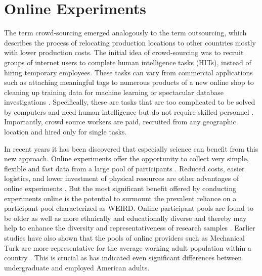 \section{Online Experiments}

The term crowd-sourcing emerged analogously to the term outsourcing, which describes the process of relocating production locations to other countries mostly with lower production costs. The initial idea of crowd-sourcing was to recruit groups of internet users to complete human intelligence tasks (HITs), instead of hiring temporary employees. These tasks can vary from commercial applications such as attaching meaningful tags to numerous products of a new online shop to cleaning up training data for machine learning or spectacular database investigations \parencite{CrowdsourceML,TurkRescue}. Specifically, these are tasks that are too complicated to be solved by computers and need human intelligence but do not require skilled personnel \parencite{BerendViabCrowd2011}. 
Importantly, crowd source workers are paid, recruited from any geographic location and hired only for single tasks. 

In recent years it has been discovered that especially science can benefit from this new approach. Online experiments offer the opportunity to collect very simple, flexible and fast data from a large pool of participants \parencite{BerendViabCrowd2011, truellResponse2002}. Reduced costs, easier logistics, and lower investment of physical resources are other advantages of online experiments \parencite{KrautOnlExpCost}. But the most significant benefit offered by conducting experiments online is the potential to surmount the prevalent reliance on a participant pool characterized as WEIRD. Online participant pools are found to be older as well as more ethnically and educationally diverse and thereby may help to enhance the diversity and representativeness of research samples \parencite{BerendViabCrowd2011, henrichWeirdest2010}. Earlier studies have also shown that the pools of online providers such as Mechanical Turk are more representative for the average working adult population within a country \parencite{BerendViabCrowd2011}. This is crucial as \textcite{WardUndergradsEmployed1993} has indicated even significant differences between undergraduate and employed American adults.

